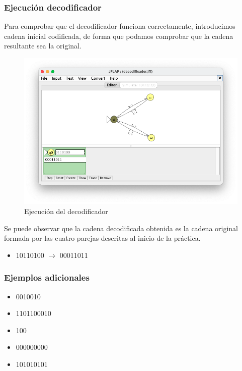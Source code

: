 \subsubsection{Ejecución decodificador}

Para comprobar que el decodificador funciona correctamente, introducimos cadena inicial codificada, de forma que podamos comprobar que la cadena resultante sea la original.

\begin{figure}[H] 
	\centering
	\includegraphics[scale=0.55]{../practica_3/images/ejecucion_decodificador.png} 
	\caption{Ejecución del decodificador} 
    \label{fig:ejecucion_decodificador}
\end{figure}

Se puede observar que la cadena decodificada obtenida es la cadena original formada por las cuatro parejas descritas al inicio de la práctica.

\begin{itemize}
	\item 10110100 $\rightarrow$ 00011011
\end{itemize}

\subsubsection{Ejemplos adicionales}

\begin{itemize}
	\item 0010010
	\item 1101100010
	\item 100
	\item 000000000
	\item 101010101
\end{itemize}

